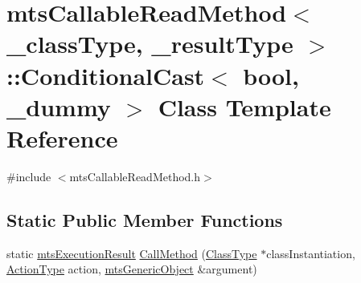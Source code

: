 \hypertarget{classmts_callable_read_method_1_1_conditional_cast}{\section{mts\-Callable\-Read\-Method$<$ \-\_\-class\-Type, \-\_\-result\-Type $>$\-:\-:Conditional\-Cast$<$ bool, \-\_\-dummy $>$ Class Template Reference}
\label{classmts_callable_read_method_1_1_conditional_cast}
}


{\ttfamily \#include $<$mts\-Callable\-Read\-Method.\-h$>$}

\subsection*{Static Public Member Functions}
\begin{DoxyCompactItemize}
\item 
static \hyperlink{classmts_execution_result}{mts\-Execution\-Result} \hyperlink{classmts_callable_read_method_1_1_conditional_cast_aeb1f85e7fc92ca13e6c54c5d16d96399}{Call\-Method} (\hyperlink{classmts_callable_read_method_a44650138085a29d60a4f3cb3616abbbf}{Class\-Type} $\ast$class\-Instantiation, \hyperlink{classmts_callable_read_method_a859894f8cceaba38ff140b96f4b8ae11}{Action\-Type} action, \hyperlink{classmts_generic_object}{mts\-Generic\-Object} \&argument)
\end{DoxyCompactItemize}


